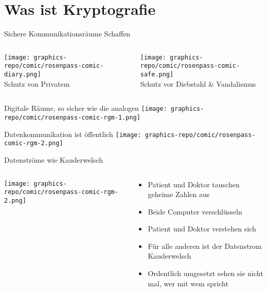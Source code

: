 \section{Was ist Kryptografie}


\begin{frame}[T]{Sichere Kommunikationsräume Schaffen}
  \begin{columns}[t,fullwidth]
    \hfill
    \begin{column}{.35\linewidth}
      \centering
      \texttt{[image: graphics-repo/comic/rosenpass-comic-diary.png]}   
      \\ Schutz von Privatem
    \end{column}
    \begin{column}{.55\linewidth}
      \centering
      \texttt{[image: graphics-repo/comic/rosenpass-comic-safe.png]}   
      \\ Schutz vor Diebstahl \& Vandalismus
    \end{column}
    \hfill
  \end{columns}
\end{frame}

\begin{frame}[T]{Digitale Räume, so sicher wie die analogen}
  \texttt{[image: graphics-repo/comic/rosenpass-comic-rgm-1.png]}
\end{frame}

\begin{frame}[T]{Datenkommunikation ist öffentlich}
  \texttt{[image: graphics-repo/comic/rosenpass-comic-rgm-2.png]}
\end{frame}

\begin{frame}[T]{Datenströme wie Kauderwelsch}
  \begin{columns}[T,fullwidth]
    \hfill
    \begin{column}{.55\linewidth}
      \texttt{[image: graphics-repo/comic/rosenpass-comic-rgm-2.png]}
    \end{column}
    \begin{column}{.38\linewidth}
      \vspace{2.3em}
      \begin{itemize}
        \item Patient und Doktor tauschen geheime Zahlen aus
        \item Beide Computer verschlüsseln
        \item Patient und Doktor verstehen sich
        \item Für alle anderen ist der Datenstrom Kauderwelsch
        \item Ordentlich umgesetzt sehen sie nicht mal, wer mit wem spricht
      \end{itemize}
    \end{column}
    \hfill
  \end{columns}
\end{frame}


